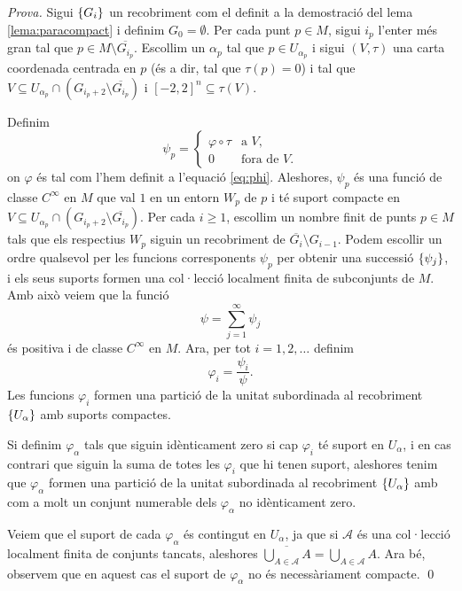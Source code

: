 {\color{green!50!black} 
    \textit{Prova.} 
    Sigui $\{G_i\}$ un recobriment com el definit a la demostració del lema \ref{lema:paracompact} i definim $G_0=\emptyset$. Per cada punt $p\in M$, sigui $i_p$ l'enter més gran tal que $p\in M\setminus \overline{G_{i_p}}$. Escollim un $\alpha_p$ tal que $p\in U_{\alpha_p}$ i sigui $(V,\tau)$ una carta coordenada centrada en $p$ (és a dir, tal que $\tau(p)=0$) i tal que $V\subseteq U_{\alpha_p}\cap(G_{i_p+2}\setminus \overline{G_{i_p}})$ i $[-2,2]^n\subseteq\tau(V)$.

    Definim 
    \begin{equation*}
        \psi_p = \begin{cases}
            \varphi\circ\tau & \text{a } V, \\
            0 & \text{fora de } V.
        \end{cases}
    \end{equation*}
    on $\varphi$ és tal com l'hem definit a l'equació \eqref{eq:phi}. Aleshores, $\psi_p$ és una funció de classe $C^\infty$ en $M$ que val $1$ en un entorn $W_p$ de $p$ i té suport compacte en $V\subseteq U_{\alpha_p}\cap(G_{i_p+2}\setminus \overline{G_{i_p}})$. Per cada $i\ge1$, escollim un nombre finit de punts $p\in M$ tals que els respectius $W_p$ siguin un recobriment de $\overline{G_i}\setminus G_{i-1}$. Podem escollir un ordre qualsevol per les funcions corresponents $\psi_p$ per obtenir una successió $\{\psi_j\}$, i els seus suports formen una col·lecció localment finita de subconjunts de $M$. Amb això veiem que la funció 
    \begin{equation*}
        \psi = \sum_{j=1}^\infty \psi_j
    \end{equation*}
    és positiva i de classe $C^\infty$ en $M$. Ara, per tot $i=1,2,\dots$ definim 
    \begin{equation*}
        \varphi_i = \frac{\psi_i}{\psi}.
    \end{equation*}
    Les funcions $\varphi_i$ formen una partició de la unitat subordinada al recobriment $\{U_\alpha\}$ amb suports compactes.

    Si definim $\varphi_\alpha$ tals que siguin idènticament zero si cap $\varphi_i$ té suport en $U_\alpha$, i en cas contrari que siguin la suma de totes les $\varphi_i$ que hi tenen suport, aleshores tenim que $\varphi_\alpha$ formen una partició de la unitat subordinada al recobriment $\{U_\alpha\}$ amb com a molt un conjunt numerable dels $\varphi_\alpha$ no idènticament zero.

    Veiem que el suport de cada $\varphi_\alpha$ és contingut en $U_\alpha$, ja que si $\mathcal A$ és una col·lecció localment finita de conjunts tancats, aleshores $\overline{\bigcup_{A\in \mathcal A} A} = \bigcup_{A\in \mathcal A} A$. Ara bé, observem que en aquest cas el suport de $\varphi_\alpha$ no és necessàriament compacte.
    \qed
}
